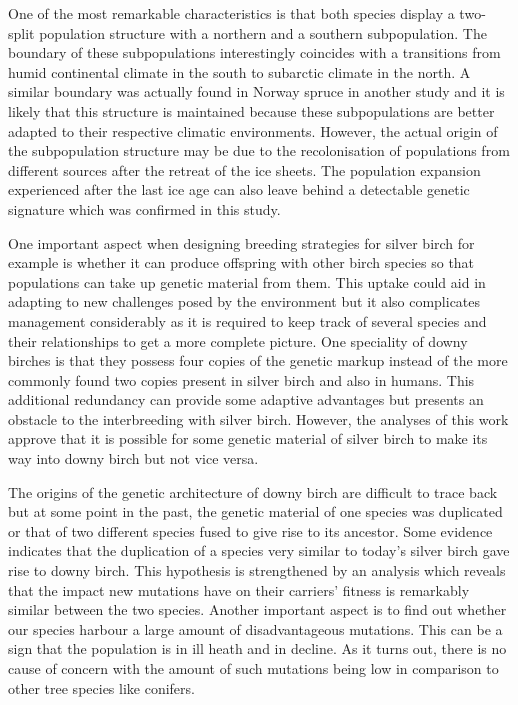 \documentclass[hidelinks,11pt]{article}
\begin{document}
    One of the most remarkable characteristics is that both species display a two-split population structure with a northern and a southern subpopulation. The boundary of these subpopulations interestingly coincides with a transitions from humid continental climate in the south to subarctic climate in the north. A similar boundary was actually found in Norway spruce in another study and it is likely that this structure is maintained because these subpopulations are better adapted to their respective climatic environments. However, the actual origin of the subpopulation structure may be due to the recolonisation of populations from different sources after the retreat of the ice sheets. The population expansion experienced after the last ice age can also leave behind a detectable genetic signature which was confirmed in this study.

    One important aspect when designing breeding strategies for silver birch for example is whether it can produce offspring with other birch species so that populations can take up genetic material from them. This uptake could aid in adapting to new challenges posed by the environment but it also complicates management considerably as it is required to keep track of several species and their relationships to get a more complete picture. One speciality of downy birches is that they possess four copies of the genetic markup instead of the more commonly found two copies present in silver birch and also in humans. This additional redundancy can provide some adaptive advantages but presents an obstacle to the interbreeding with silver birch. However, the analyses of this work approve that it is possible for some genetic material of silver birch to make its way into downy birch but not vice versa.

    The origins of the genetic architecture of downy birch are difficult to trace back but at some point in the past, the genetic material of one species was duplicated or that of two different species fused to give rise to its ancestor. Some evidence indicates that the duplication of a species very similar to today's silver birch gave rise to downy birch. This hypothesis is strengthened by an analysis which reveals that the impact new mutations have on their carriers' fitness is remarkably similar between the two species. Another important aspect is to find out whether our species harbour a large amount of disadvantageous mutations. This can be a sign that the population is in ill heath and in decline. As it turns out, there is no cause of concern with the amount of such mutations being low in comparison to other tree species like conifers.
\end{document}
